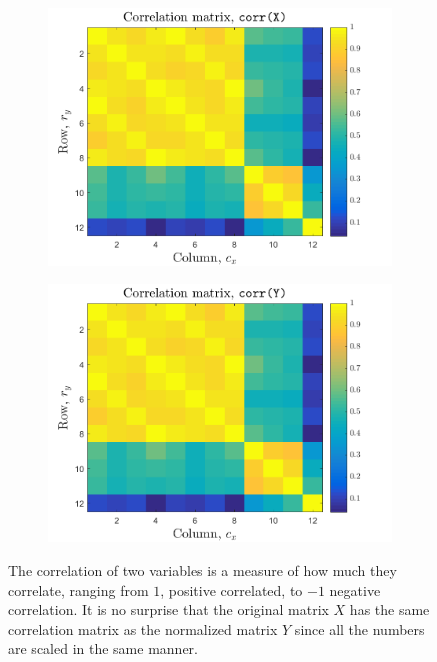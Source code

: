 \documentclass{article}
\begin{document}
\begin{figure}[H]
    \centering
    \begin{subfigure}[b]{0.40\textwidth}
        \centering
        \includegraphics[width=\textwidth]{Figures/plot2_2_corr_x.png}
    \end{subfigure}
    \begin{subfigure}[b]{0.40\textwidth}
        \centering
        \includegraphics[width=\textwidth]{Figures/plot2_2_corr_y.png}
    \end{subfigure}
    \caption{\label{fig:corr} The correlation of two variables is a measure of how much they correlate, ranging from $1$, positive correlated, to $-1$ negative correlation. It is no surprise that the original matrix $X$ has the same correlation matrix as the normalized matrix $Y$ since all the numbers are scaled in the same manner. }
\end{figure}
\end{document}
